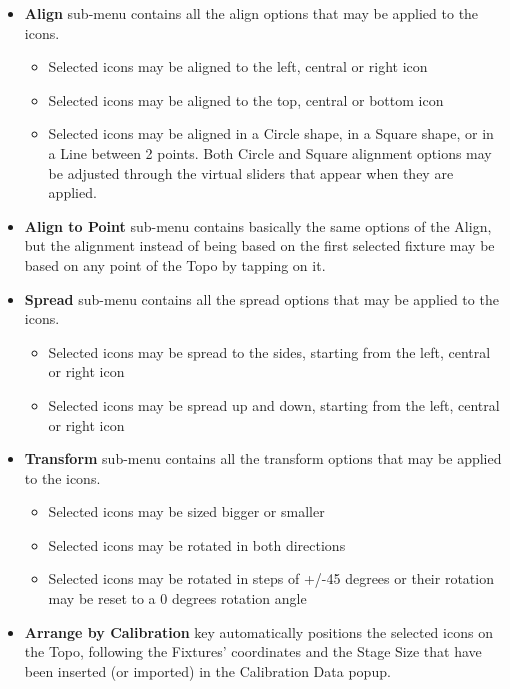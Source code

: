 \documentclass[
]{article}
\begin{document}
\begin{itemize}
\item
  \textbf{Align} sub-menu contains all the align options that may be applied to the icons.

  \begin{itemize}
  \item
    Selected icons may be aligned to the left, central or right icon
  \item
    Selected icons may be aligned to the top, central or bottom icon
  \item
    Selected icons may be aligned in a Circle shape, in a Square shape, or in a Line between 2 points. Both Circle and Square alignment options may be adjusted through the virtual sliders that appear when they are applied.
  \end{itemize}
\item
  \textbf{Align to Point} sub-menu contains basically the same options of the Align, but the alignment instead of being based on the first selected fixture may be based on any point of the Topo by tapping on it.
\item
  \textbf{Spread} sub-menu contains all the spread options that may be applied to the icons.

  \begin{itemize}
  \item
    Selected icons may be spread to the sides, starting from the left, central or right icon
  \item
    Selected icons may be spread up and down, starting from the left, central or right icon
  \end{itemize}
\item
  \textbf{Transform} sub-menu contains all the transform options that may be applied to the icons.

  \begin{itemize}
  \item
    Selected icons may be sized bigger or smaller
  \item
    Selected icons may be rotated in both directions
  \item
    Selected icons may be rotated in steps of +/-45 degrees or their rotation may be reset to a 0 degrees rotation angle
  \end{itemize}
\item
  \textbf{Arrange by Calibration} key automatically positions the selected icons on the Topo, following the Fixtures' coordinates and the Stage Size that have been inserted (or imported) in the Calibration Data popup.
\end{itemize}
\end{document}
